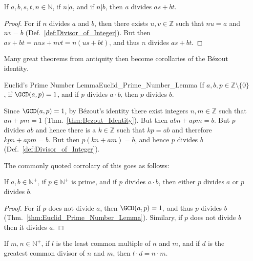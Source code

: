 \documentclass{article}                                                        %
\begin{document}
            \begin{theorem}
                \label{thm:n_Div_AB_then_A_Div_AS_BT}%
                If $a,b,s,t,n\in\mathbb{N}$, if $n|a$, and if $n|b$, then $a$
                divides $as+bt$.
            \end{theorem}
            \begin{proof}
                For if $n$ divides $a$ and $b$, then there exists $u,v\in\mathbb{Z}$
                such that $nu=a$ and $nv=b$ (Def.~\ref{def:Divisor_of_Integer}). But
                then $as+bt=nus+nvt=n(us+bt)$, and thus $n$ divides $as+bt$.
            \end{proof}
            Many great theorems from antiquity then become corollaries of the
            B\'{e}zout identity.
            \begin{ftheorem}{Euclid's Prime Number Lemma}{Euclid_Prime_Number_Lemma}
                If $a,b,p\in\mathbb{Z}\setminus\{0\}$, if $\GCD(a,p)=1$, and if $p$
                divides $a\cdot{b}$, then $p$ divides $b$.
            \end{ftheorem}
            \begin{bproof}
                Since $\GCD(a,p)=1$, by B\'{e}zout's identity there exist integers
                $n,m\in\mathbb{Z}$ such that $an+pm=1$
                (Thm.~\ref{thm:Bezout_Identity}). But then $abn+apm=b$. But $p$
                divides $ab$ and hence there is a $k\in\mathbb{Z}$ such that $kp=ab$
                and therefore $kpn+apm=b$. But then $p(kn+am)=b$, and hence $p$
                divides $b$ (Def.~\ref{def:Divisor_of_Integer}).
            \end{bproof}
            The commonly quoted corrolary of this goes as follows:
            \begin{theorem}
                \label{thm:Prime_Div_AB_then_PdivA_or_PdivB}%
                If $a,b\in\mathbb{N}^{+}$, if $p\in\mathbb{N}^{+}$ is prime, and if
                $p$ divides $a\cdot{b}$, then either $p$ divides $a$ or $p$ divides
                $b$.
            \end{theorem}
            \begin{proof}
                For if $p$ does not divide $a$, then $\GCD(a,p)=1$, and thus
                $p$ divides $b$ (Thm.~\ref{thm:Euclid_Prime_Number_Lemma}).
                Similary, if $p$ does not divide $b$ then it divides $a$.
            \end{proof}
            \begin{theorem}
                If $m,n\in\mathbb{N}^{+}$, if $l$ is the least common multiple of
                $n$ and $m$, and if $d$ is the greatest common divisor of $n$ and
                $m$, then $l\cdot{d}=n\cdot{m}$.
            \end{theorem}
\end{document}
